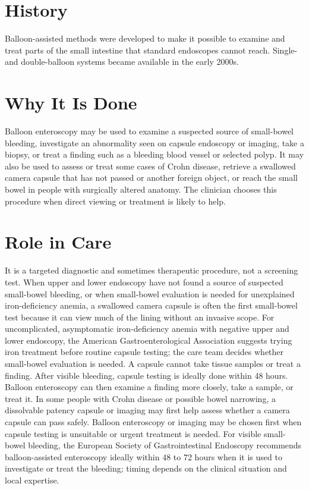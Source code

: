 \section*{History}
Balloon-assisted methods were developed to make it possible to examine and treat parts of the small intestine that standard endoscopes cannot reach. Single- and double-balloon systems became available in the early 2000s.

\section*{Why It Is Done}
Balloon enteroscopy may be used to examine a suspected source of small-bowel bleeding, investigate an abnormality seen on capsule endoscopy or imaging, take a biopsy, or treat a finding such as a bleeding blood vessel or selected polyp. It may also be used to assess or treat some cases of Crohn disease, retrieve a swallowed camera capsule that has not passed or another foreign object, or reach the small bowel in people with surgically altered anatomy. The clinician chooses this procedure when direct viewing or treatment is likely to help.

\section*{Role in Care}
It is a targeted diagnostic and sometimes therapeutic procedure, not a screening test. When upper and lower endoscopy have not found a source of suspected small-bowel bleeding, or when small-bowel evaluation is needed for unexplained iron-deficiency anemia, a swallowed camera capsule is often the first small-bowel test because it can view much of the lining without an invasive scope. For uncomplicated, asymptomatic iron-deficiency anemia with negative upper and lower endoscopy, the American Gastroenterological Association suggests trying iron treatment before routine capsule testing; the care team decides whether small-bowel evaluation is needed. A capsule cannot take tissue samples or treat a finding. After visible bleeding, capsule testing is ideally done within 48 hours. Balloon enteroscopy can then examine a finding more closely, take a sample, or treat it. In some people with Crohn disease or possible bowel narrowing, a dissolvable patency capsule or imaging may first help assess whether a camera capsule can pass safely. Balloon enteroscopy or imaging may be chosen first when capsule testing is unsuitable or urgent treatment is needed. For visible small-bowel bleeding, the European Society of Gastrointestinal Endoscopy recommends balloon-assisted enteroscopy ideally within 48 to 72 hours when it is used to investigate or treat the bleeding; timing depends on the clinical situation and local expertise.

